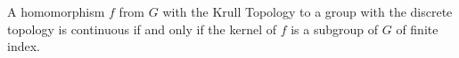 A homomorphism $f$ from $G$ with the Krull Topology to a group with the discrete topology is continuous if and only if the kernel of $f$ is a subgroup of $G$ of finite index.

